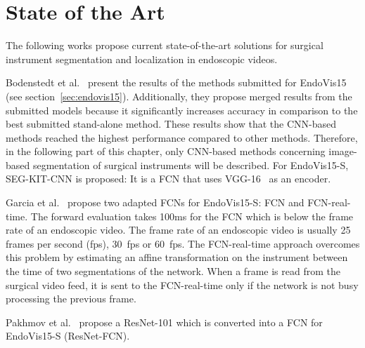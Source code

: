 \chapter{State of the Art}
\label{cha:stateOfTheArt}
The following works propose current state-of-the-art solutions for surgical instrument segmentation and localization in endoscopic videos.


 
Bodenstedt et al.~\cite{miccai15_results2018bodenstedt} present the results of the methods submitted for EndoVis15 (see section~\ref{sec:endovis15}). Additionally, they propose merged results from the submitted models because it significantly increases accuracy in comparison to the best submitted stand-alone method. These results show that the CNN-based methods reached the highest performance compared to other methods. Therefore, in the following part of this chapter, only CNN-based methods concerning image-based segmentation of surgical instruments will be described.
For EndoVis15-S, SEG-KIT-CNN is proposed: It is a FCN that uses VGG-16~\cite{simonyan2014vgg} as an encoder.

Garcia et al.~\cite{garcia2017segm_nonrigid_book} propose two adapted FCNs for EndoVis15-S: FCN and FCN-real-time.
The forward evaluation takes 100ms for the FCN which is below the frame rate of an endoscopic video. The frame rate of an endoscopic video is usually 25 frames per second (fps), 30~fps or 60~fps.
The FCN-real-time approach overcomes this problem by estimating an affine transformation on the instrument between the time of two segmentations of the network. 
When a frame is read from the surgical video feed, it is sent to the FCN-real-time only if the network is not busy processing the previous frame.

Pakhmov et al.~\cite{deep_residual_instr_segm2017pakhmov} propose a ResNet-101 which is converted into a FCN for EndoVis15-S (ResNet-FCN).

